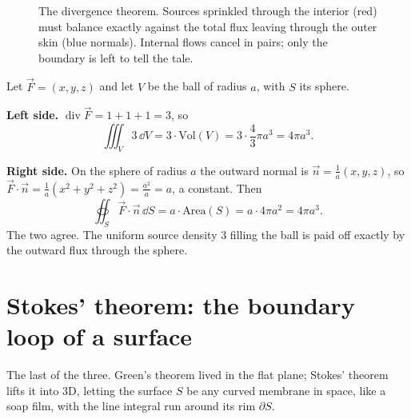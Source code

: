 \begin{figure}[H]
\centering
{}
\caption{The divergence theorem. Sources sprinkled through the interior (red) must
balance exactly against the total flux leaving through the outer skin (blue
normals). Internal flows cancel in pairs; only the boundary is left to tell the
tale.}
\label{ch35:fig-div}
\end{figure}

\begin{example}
\label{ch35:ex-div}
Let $\vec F=(x,y,z)$ and let $V$ be the ball of radius $a$, with $S$ its sphere.

\textbf{Left side.} $\operatorname{div}\vec F = 1+1+1 = 3$, so
\[
  \iiint_V 3\,\dd V = 3\cdot \text{Vol}(V) = 3\cdot\frac{4}{3}\pi a^3 = 4\pi a^3.
\]

\textbf{Right side.} On the sphere of radius $a$ the outward normal is
$\vec n = \frac{1}{a}(x,y,z)$, so
$\vec F\cdot\vec n = \frac{1}{a}(x^2+y^2+z^2) = \frac{a^2}{a} = a$, a constant.
Then
\[
  \oiint_S \vec F\cdot\vec n\,\dd S = a\cdot \text{Area}(S) = a\cdot 4\pi a^2 = 4\pi a^3.
\]
The two agree. The uniform source density $3$ filling the ball is paid off exactly
by the outward flux through the sphere.
\end{example}

\section{Stokes' theorem: the boundary loop of a surface}
\label{ch35:stokes}

The last of the three. Green's theorem lived in the flat plane; Stokes' theorem
lifts it into 3D, letting the surface $S$ be any curved membrane in space, like a
soap film, with the line integral run around its rim $\partial S$.

